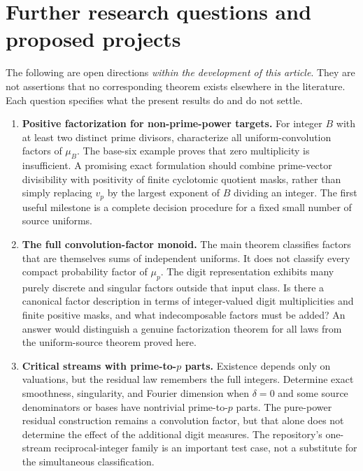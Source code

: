 \documentclass[11pt,a4paper]{article}
\theoremstyle{remark}
\begin{document}
\section{Further research questions and proposed projects}
\label{sec:research}

The following are open directions \emph{within the development of this article}.
They are not assertions that no corresponding theorem exists elsewhere in the
literature. Each question specifies what the present results do and do not settle.

\begin{enumerate}[label=\textbf{Q\arabic*.},leftmargin=3em]
\item \textbf{Positive factorization for non-prime-power targets.}
For integer $B$ with at least two distinct prime divisors, characterize all
uniform-convolution factors of $\mu_B$. The base-six example proves that zero
multiplicity is insufficient. A promising exact formulation should combine
prime-vector divisibility with positivity of finite cyclotomic quotient masks,
rather than simply replacing $v_p$ by the largest exponent of $B$ dividing an
integer. The first useful milestone is a complete decision procedure for a fixed
small number of source uniforms.

\item \textbf{The full convolution-factor monoid.}
The main theorem classifies factors that are themselves sums of independent
uniforms. It does not classify every compact probability factor of $\mu_p$.
The digit representation exhibits many purely discrete and singular factors
outside that input class. Is there a canonical factor description in terms of
integer-valued digit multiplicities and finite positive masks, and what
indecomposable factors must be added? An answer would distinguish a genuine
factorization theorem for all laws from the uniform-source theorem proved here.

\item \textbf{Critical streams with prime-to-$p$ parts.}
Existence depends only on valuations, but the residual law remembers the full
integers. Determine exact smoothness, singularity, and Fourier dimension when
$\delta=0$ and some source denominators or bases have nontrivial prime-to-$p$
parts. The pure-power residual construction remains a convolution factor, but
that alone does not determine the effect of the additional digit measures.
The repository's one-stream reciprocal-integer family is an important test case,
not a substitute for the simultaneous classification.


\end{enumerate}
\end{document}
